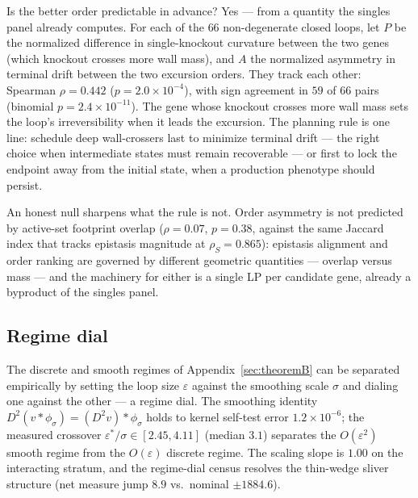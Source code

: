 \documentclass[11pt,a4paper]{article}
\theoremstyle{plain}
\theoremstyle{definition}
\theoremstyle{remark}
\begin{document}
Is the better order predictable in advance? Yes --- from a
quantity the singles panel already computes. For each of the $66$
non-degenerate closed loops, let $P$ be the normalized difference
in single-knockout curvature between the two genes (which knockout
crosses more wall mass), and $A$ the normalized asymmetry in
terminal drift between the two excursion orders. They track each
other: Spearman $\rho = 0.442$ ($p = 2.0 \times 10^{-4}$), with
sign agreement in $59$ of $66$ pairs (binomial $p = 2.4 \times
10^{-11}$). The gene whose knockout crosses more wall mass sets
the loop's irreversibility when it leads the excursion. The
planning rule is one line: schedule deep wall-crossers last to
minimize terminal drift --- the right choice when intermediate
states must remain recoverable --- or first to lock the endpoint
away from the initial state, when a production phenotype should
persist.

An honest null sharpens what the rule is not. Order asymmetry is
not predicted by active-set footprint overlap ($\rho = 0.07$,
$p = 0.38$, against the same Jaccard index that tracks epistasis
magnitude at $\rho_S = 0.865$): epistasis alignment and order
ranking are governed by different geometric quantities ---
overlap versus mass --- and the machinery for either is a single
LP per candidate gene, already a byproduct of the singles panel.
\subsection{Regime dial}
\label{sec:m4}
The discrete and smooth regimes of Appendix~\ref{sec:theoremB} can be
separated empirically by setting the loop size $\varepsilon$ against
the smoothing scale $\sigma$ and dialing one against the other --- a
regime dial. The smoothing identity $D^2(v * \phi_\sigma) = (D^2 v) * \phi_\sigma$
holds to kernel self-test error $1.2 \times 10^{-6}$; the measured
crossover $\varepsilon^*/\sigma \in [2.45, 4.11]$ (median $3.1$)
separates the $O(\varepsilon^2)$ smooth regime from the
$O(\varepsilon)$ discrete regime. The scaling slope is $1.00$ on the
interacting stratum, and the regime-dial census resolves the
thin-wedge sliver structure (net measure jump $8.9$ vs.\ nominal
$\pm 1884.6$).
\end{document}
